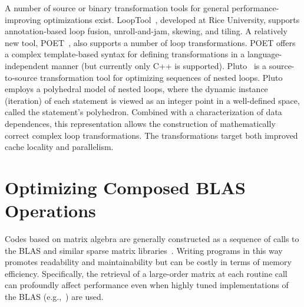 \documentclass[runningheads]{llncs}
\begin{document}

A number of source or binary transformation tools for general
performance-improving optimizations exist. LoopTool~\cite{LoopTool},
developed at Rice University, supports annotation-based loop fusion,
unroll-and-jam, skewing, and tiling.  A relatively new tool, POET~\cite{POET},
also supports a number of loop transformations. POET offers a complex
template-based syntax for defining transformations in a language-independent
manner (but currently only C++ is supported). 
Pluto~\cite{Pluto}
is a source-to-source transformation tool for
optimizing sequences of nested loops. Pluto employs a polyhedral model of
nested loops, where the dynamic instance (iteration) of each statement is
viewed as an integer point in a well-defined space, called the statement's
polyhedron. Combined with a characterization of data dependences, this
representation allows the construction of mathematically correct complex loop
transformations. The transformations target both improved cache locality and
parallelism.

\section{Optimizing Composed BLAS Operations}
\label{sec:approach}

Codes based on matrix algebra are generally constructed as a sequence of
calls to the BLAS
and similar
sparse matrix libraries~\cite{Saad:fr}.
Writing programs in
this way promotes readability and maintainability but can be costly in terms
of memory efficiency. Specifically, the retrieval of a large-order matrix at
each routine call can profoundly affect performance even when highly
tuned implementations of the BLAS (e.g.,~\cite{Goto:2006fk})
are used.
\end{document}
